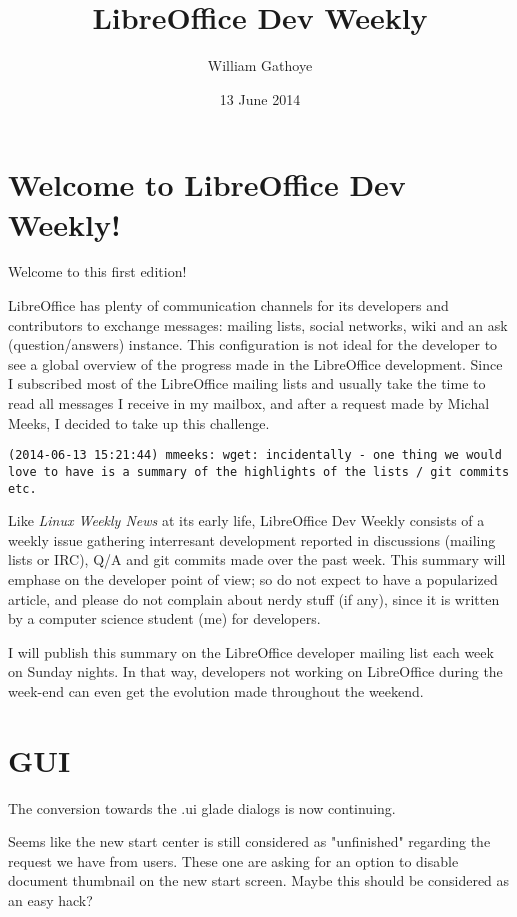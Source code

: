 \documentclass{article}
\begin{document}
\title{LibreOffice Dev Weekly}
\author{William Gathoye}
\date{13 June 2014}
\maketitle


\section{Welcome to LibreOffice Dev Weekly!}

Welcome to this first edition!

LibreOffice has plenty of communication channels for its developers and contributors to exchange messages: mailing lists, social networks, wiki and an ask (question/answers) instance. This configuration is not ideal for the developer to see a global overview of the progress made in the LibreOffice development. Since I subscribed most of the LibreOffice mailing lists and usually take the time to read all messages I receive in my mailbox, and after a request made by Michal Meeks, I decided to take up this challenge.

\begin{lstlisting}
(2014-06-13 15:21:44) mmeeks: wget: incidentally - one thing we would love to have is a summary of the highlights of the lists / git commits etc.
\end{lstlisting}

Like \emph{Linux Weekly News} at its early life, LibreOffice Dev Weekly consists of a weekly issue gathering interresant development reported in discussions (mailing lists or IRC), Q/A and git commits made over the past week. This summary will emphase on the developer point of view; so do not expect to have a popularized article, and please do not complain about nerdy stuff (if any), since it is written by a computer science student (me) for developers. 

I will publish this summary on the LibreOffice developer mailing list each week on Sunday nights. In that way, developers not working on LibreOffice during the week-end can even get the evolution made throughout the weekend.


\section{GUI}

The conversion towards the .ui glade dialogs is now continuing\cite{gladeUi1,gladeUi2,gladeUi3}.

Seems like the new start center is still considered as "unfinished"
regarding the request we have from users. These one are asking for an
option to disable document thumbnail on the new start screen\cite{startCenterHidePreview1}\cite{startCenterHidePreview2}. Maybe this should be considered as an easy hack?
\end{document}
